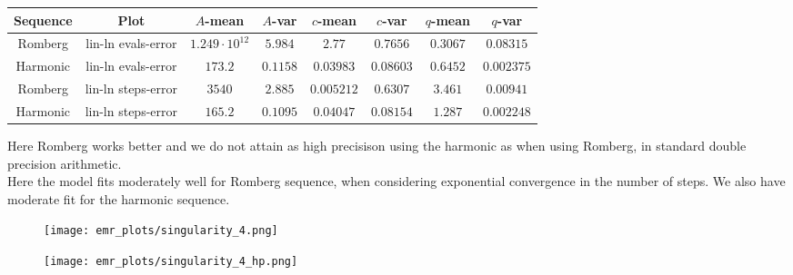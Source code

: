 \begin{table}[H]
    \centering
    \small
     \begin{tabular}{c|c||c|c|c|c|c|c}
Sequence & Plot & \(A\)-mean & \(A\)-var & \(c\)-mean & \(c\)-var & \(q\)-mean & \(q\)-var\\\hline
Romberg & lin-ln evals-error & \(1.249\cdot 10^{12}\) & \(5.984\) & \(2.77\) & \(0.7656\) & \(0.3067\) & \(0.08315\) \\
Harmonic & lin-ln evals-error & \(173.2\) & \(0.1158\) & \(0.03983\) & \(0.08603\) & \(0.6452\) & \(0.002375\) \\
Romberg & lin-ln steps-error & \(3540\) & \(2.885\) & \(0.005212\) & \(0.6307\) & \(3.461\) & \(0.00941\) \\
Harmonic & lin-ln steps-error & \(165.2\) & \(0.1095\) & \(0.04047\) & \(0.08154\) & \(1.287\) & \(0.002248\) \\
    \end{tabular}
    \label{tab:my_label}
\end{table}

Here Romberg works better and we do not attain as high precisison using the harmonic as when using Romberg, in standard double precision arithmetic.\\

Here the model fits moderately well for Romberg sequence, when considering exponential convergence in the number of steps. We also have moderate fit for the harmonic sequence.

\begin{figure}[H]
\centering
\begin{minipage}{0.45\textwidth}
\centering
\texttt{[image: emr\_plots/singularity\_4.png]}
\end{minipage}
\begin{minipage}{0.45\textwidth}
\centering
\texttt{[image: emr\_plots/singularity\_4\_hp.png]}
\end{minipage}
\end{figure}

